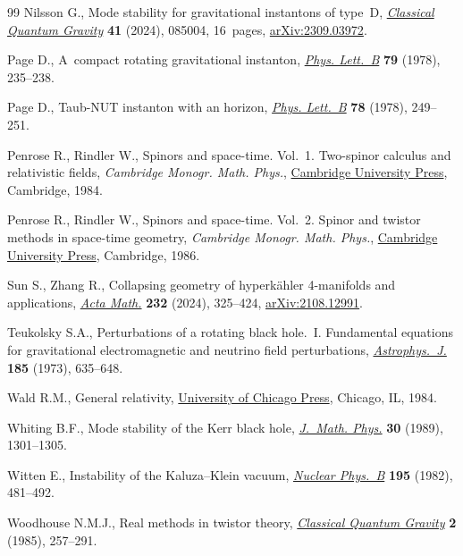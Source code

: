 \documentclass[pdftex]{sigma}
\numberwithin{equation}{section}
\begin{document}
\begin{thebibliography}{99}
Nilsson G., Mode stability for gravitational instantons of type~{D},
 \href{https://doi.org/10.1088/1361-6382/ad296f}{\textit{Classical Quantum Gravity}} \textbf{41} (2024), 085004, 16~pages,
 \href{https://arxiv.org/abs/2309.03972}{arXiv:2309.03972}.

Page D., A~compact rotating gravitational instanton, \href{https://doi.org/10.1016/0370-2693(78)90231-9}{\textit{Phys. Lett.~B}}
 \textbf{79} (1978), 235--238.

Page D., Taub-{NUT} instanton with an horizon, \href{https://doi.org/10.1016/0370-2693(78)90016-3}{\textit{Phys. Lett.~B}}
 \textbf{78} (1978), 249--251.

Penrose R., Rindler W., Spinors and space-time. {V}ol.~1. {T}wo-spinor calculus
 and relativistic fields, \textit{Cambridge Monogr. Math. Phys.}, \href{https://doi.org/10.1017/CBO9780511564048}{Cambridge University
 Press}, Cambridge, 1984.

Penrose R., Rindler W., Spinors and space-time. {V}ol.~2. Spinor and twistor
 methods in space-time geometry, \textit{Cambridge Monogr. Math. Phys.}, \href{https://doi.org/10.1017/CBO9780511524486}{Cambridge
 University Press}, Cambridge, 1986.

Sun S., Zhang R., Collapsing geometry of hyperk\"ahler 4-manifolds and
 applications, \href{https://doi.org/10.4310/acta.2024.v232.n2.a2}{\textit{Acta Math.}} \textbf{232} (2024), 325--424,
 \href{https://arxiv.org/abs/2108.12991}{arXiv:2108.12991}.

Teukolsky S.A., Perturbations of a rotating black hole.~{I}. Fundamental
 equations for gravitational electromagnetic and neutrino field perturbations,
 \href{https://doi.org/10.1086/152444}{\textit{Astrophys.~J.}} \textbf{185} (1973), 635--648.

Wald R.M., General relativity, \href{https://doi.org/10.7208/chicago/9780226870373.001.0001}{University of Chicago Press}, Chicago, IL, 1984.

Whiting B.F., Mode stability of the {K}err black hole, \href{https://doi.org/10.1063/1.528308}{\textit{J.~Math. Phys.}}
 \textbf{30} (1989), 1301--1305.

Witten E., Instability of the {K}aluza--{K}lein vacuum, \href{https://doi.org/10.1016/0550-3213(82)90007-4}{\textit{Nuclear
 Phys.~B}} \textbf{195} (1982), 481--492.

Woodhouse N.M.J., Real methods in twistor theory, \href{https://doi.org/10.1088/0264-9381/2/3/006}{\textit{Classical Quantum
 Gravity}} \textbf{2} (1985), 257--291.

\end{thebibliography}\LastPageEnding
\end{document}
